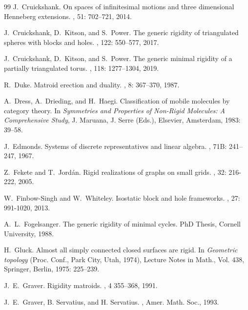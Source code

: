 \documentclass{daj}
\begin{document}
\begin{thebibliography}{99}
J.~Cruickshank. 
\newblock  On spaces of infinitesimal motions and three dimensional Henneberg extensions.
, 51: 702--721, 2014.

J.~Cruickshank, D.~Kitson, and S.~Power. 
\newblock  The generic rigidity of triangulated spheres with blocks and holes.
, 122: 550--577, 2017.

J.~Cruickshank, D.~Kitson, and S.~Power. 
\newblock  The generic minimal rigidity of a partially triangulated torus.
, 118: 1277--1304, 2019. 


 R.~Duke. 
\newblock  Matroid erection and duality.
, 8: 367--370, 1987.

 A.~Dress, A.~Drieding, and H.~Haegi. 
\newblock  Classification of mobile molecules by category theory. In {\em Symmetries and Properties of Non-Rigid Molecules: A Comprehensive Study}, J. Maruana,
J. Serre (Eds.), Elsevier,
Amsterdam, 1983:  39--58.

 J.~Edmonds. 
\newblock  Systems of discrete representatives and linear algebra.
, 71B: 241--247, 1967.

 Z.~Fekete and T.~Jord\'an. 
\newblock  Rigid
realizations of graphs on small grids.
, 32: 216-222, 2005.


W.~Finbow-Singh and W.~Whiteley. 
\newblock 
Isostatic block and hole frameworks.
, 27: 991-1020, 2013.

 A.~L.~Fogelsanger. 
\newblock  The generic rigidity of minimal cycles. PhD Thesis, Cornell University, 1988.

{ H.~Gluck}. 
\newblock  Almost all simply connected closed surfaces are rigid. In
{\em Geometric topology} (Proc. Conf., Park City, Utah, 1974),
Lecture Notes in Math., Vol. 438,
Springer, Berlin, 1975: 225--239.

 J.~E.~Graver. 
\newblock  Rigidity matroids.
, 4  355--368, 1991.

 J.~E.~Graver, B. Servatius, and H. Servatius. 
,  Amer. Math. Soc., 1993.



\end{thebibliography}
\end{document}
